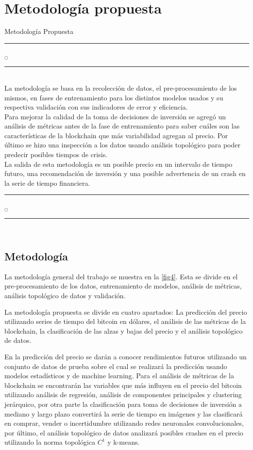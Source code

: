 \chapter[Metodología]{Metodología propuesta}{Metodología Propuesta}\label{Metodologia}

\noindent
\rule{0.49\textwidth}{0.75pt} $_{\bigcirc}$ \rule{0.49\textwidth}{0.75pt}\\

La metodología se basa en la recolección de datos, el pre-procesamiento de los mismos, en fases de entrenamiento para los distintos modelos usados y su respectiva validación con sus indicadores de error y eficiencia.\\
Para mejorar la calidad de la toma de decisiones de inversión se agregó un análisis de métricas antes de la fase de entrenamiento para saber cuáles son las características de la blockchain que más variabilidad agregan al precio. Por último se hizo una inspección a los datos usando análisis topológico para poder predecir posibles tiempos de crisis.\\
La salida de esta metodología es un posible precio en un intervalo de tiempo futuro, una recomendación de inversión y una posible advertencia de un crash en la serie de tiempo financiera.\\

\noindent
\rule{0.49\textwidth}{0.75pt} $_{\bigcirc}$ \rule{0.49\textwidth}{0.75pt}\\
\clearpage

\section{Metodología}
La metodología general del trabajo se muestra en la \autoref{fig4}. Esta se divide en el pre-procesamiento de los datos, entrenamiento de modelos, análisis de métricas, análisis topológico de datos y validación.

La metodología propuesta se divide en cuatro apartados: La predicción del precio utilizando series de tiempo del bitcoin en dólares, el análisis de las métricas de la blockchain, la clasificación de las alzas y bajas del precio y el análisis topológico de datos.
 
En la predicción del precio se darán a conocer rendimientos futuros utilizando un conjunto de datos de prueba sobre el cual se realizará la predicción usando modelos estadísticos y de machine learning. Para el análisis de métricas de la blockchain se encontrarán las variables que más influyen en el precio del bitcoin utilizando análisis de regresión, análisis de componentes principales y clustering jerárquico, por otra parte la clasificación para toma de decisiones de inversión a mediano y largo plazo convertirá la serie de tiempo en imágenes y las clasificará en comprar, vender o incertidumbre utilizando redes neuronales convolucionales, por último, el análisis topológico de datos analizará posibles crashes en el precio utilizando la norma topológica $C^1$ y k-means. 
\vspace{-0.59cm}

